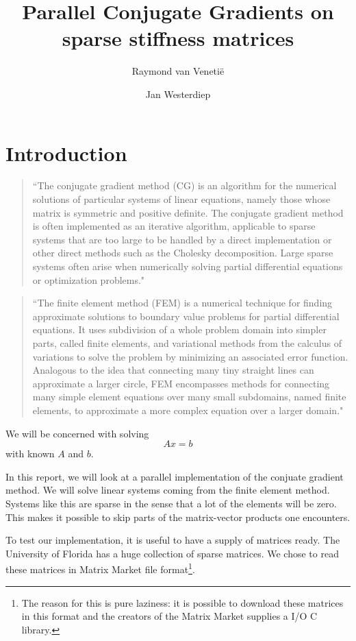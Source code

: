 \documentclass[11pt]{amsart}
\theoremstyle{definition}
\begin{document}
\title{Parallel Conjugate Gradients on sparse stiffness matrices}
\author{Raymond van Veneti\"e \and Jan Westerdiep}
\maketitle

\section{Introduction}
\begin{quote}
``The conjugate gradient method (CG) is an algorithm for the numerical solutions of particular systems of linear equations, namely those whose matrix is symmetric and positive definite. The conjugate gradient method is often implemented as an iterative algorithm, applicable to sparse systems that are too large to be handled by a direct implementation or other direct methods such as the Cholesky decomposition. Large sparse systems often arise when numerically solving partial differential equations or optimization problems." \cite{wiki:cg}
\end{quote}

\begin{quote}
``The finite element method (FEM) is a numerical technique for finding approximate solutions to boundary value problems for partial differential equations. It uses subdivision of a whole problem domain into simpler parts, called finite elements, and variational methods from the calculus of variations to solve the problem by minimizing an associated error function. Analogous to the idea that connecting many tiny straight lines can approximate a larger circle, FEM encompasses methods for connecting many simple element equations over many small subdomains, named finite elements, to approximate a more complex equation over a larger domain." \cite{wiki:fem}
\end{quote}

We will be concerned with solving
\[
  Ax = b
\]
with known $A$ and $b$.

In this report, we will look at a parallel implementation of the conjuate gradient method. We will solve linear systems coming from the finite element method. Systems like this are sparse in the sense that a lot of the elements will be zero. This makes it possible to skip parts of the matrix-vector products one encounters.

To test our implementation, it is useful to have a supply of matrices ready. The University of Florida has a huge collection of sparse matrices. \cite{uniflo} We chose to read these matrices in Matrix Market file format\footnote{The reason for this is pure laziness: it is possible to download these matrices in this format and the creators of the Matrix Market supplies a I/O C library.}. \cite{matmar}
\end{document}
